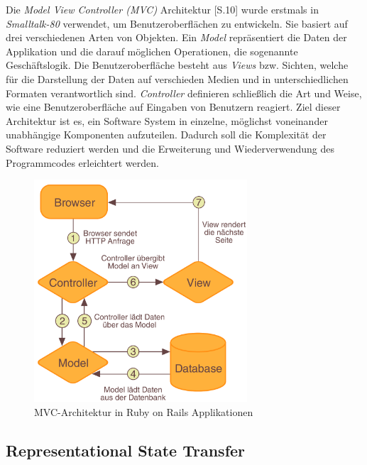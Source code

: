 Die \textit{Model View Controller (MVC)} Architektur
\cite{Gamma95Design}[S.10] wurde erstmals in \textit{Smalltalk-80}
verwendet, um Benutzeroberflächen zu entwickeln. Sie basiert auf drei
verschiedenen Arten von Objekten. Ein \textit{Model} repräsentiert die
Daten der Applikation und die darauf möglichen Operationen, die
sogenannte Geschäftslogik. Die Benutzeroberfläche besteht aus
\textit{Views} bzw. Sichten, welche für die Darstellung der Daten auf
verschieden Medien und in unterschiedlichen Formaten verantwortlich
sind. \textit{Controller} definieren schließlich die Art und Weise,
wie eine Benutzeroberfläche auf Eingaben von Benutzern reagiert. Ziel
dieser Architektur ist es, ein Software System in einzelne, möglichst
voneinander unabhängige Komponenten aufzuteilen. Dadurch soll die
Komplexität der Software reduziert werden und die Erweiterung und
Wiederverwendung des Programmcodes erleichtert werden.

\begin{figure}[h]
  \begin{center}
    \includegraphics[width=300px]{bilder/mvc}
    \caption{MVC-Architektur in Ruby on Rails Applikationen}
  \end{center}
\end{figure}

\subsection{Representational State Transfer}
\label{rest}

